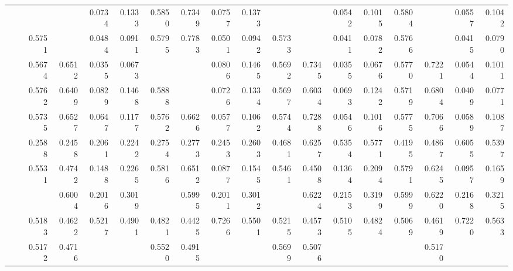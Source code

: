 {\begin{table*}[t]
{\begin{tabular}{|l|l|r|r|r|r|r|r|r|r|r|r|r|r|r|r|r|r|}
				\multirow{11}{*}{\rotatebox{90}{\Arxiv}} 
			     &\ATC       & \cellcolor{LightCyan}{0.5802} & \cellcolor{LightCyan}{0.7253} & 0.0734 & 0.1333 & 0.5850 & 0.7349 & 0.0757 & 0.1373 & \cellcolor{LightCyan}{0.5767} & \cellcolor{LightCyan}{0.7875} & 0.0542 & 0.1015 & 0.5804 & \cellcolor{LightCyan}{0.7930} & 0.0557 & 0.1042 \\
			      &\CTC       & 0.5751 & \cellcolor{LightRed}{0.7693} & 0.0484 & 0.0911 & 0.5795 & 0.7783 & 0.0501 & 0.0942 & 0.5733 & \cellcolor{LightRed}{0.8160} & 0.0411 & 0.0782 & 0.5766 & \cellcolor{LightRed}{0.8200} & 0.0415 & 0.0790 \\\cline{2-18}
			      &\MAML      & 0.5674 & 0.6512 & 0.0355 & 0.0673 & \cellcolor{LightRed}{0.5903} & \cellcolor{LightCyan}{0.8005} & 0.0806 & 0.1465 & 0.5692 & 0.7345 & 0.0355 & 0.0676 & 0.5770 & 0.7221 & 0.0544 & 0.1011 \\
			      &\Reptile   & 0.5762 & 0.6409 & 0.0829 & 0.1468 & 0.5888 & \cellcolor{LightRed}{0.8260} & 0.0726 & 0.1334 & 0.5697 & 0.6034 & 0.0693 & 0.1242 & 0.5719 & 0.6804 & 0.0409 & 0.0771 \\
			      &\Featrans  & 0.5735 & 0.6527 & 0.0647 & 0.1177 & 0.5762 & 0.6626 & 0.0577 & 0.1062 & 0.5744 & 0.7288 & 0.0546 & 0.1016 & 0.5775 & 0.7066 & 0.0589 & 0.1087 \\
			      &\PN        & 0.2588 & 0.2458 & 0.2061 & 0.2242 & 0.2754 & 0.2773 & 0.2453 & 0.2603 & 0.4681 & 0.6257 & 0.5354 & \cellcolor{LightCyan}0.5771 & 0.4195 & 0.4867 & 0.6055 & 0.5397 \\\cline{2-18}
			      &\Supervise & 0.5531 & 0.4742 & 0.1488 & 0.2265 & 0.5816 & 0.6512 & 0.0877 & 0.1545 & 0.5461 & 0.4508 & 0.1364 & 0.2094 & 0.5791 & 0.6245 & 0.0957 & 0.1659 \\
			      &\ICSGNN    & \cellcolor{LightRed}{0.5904} & 0.6004 & 0.2016 & 0.3019 & \cellcolor{LightCyan}{0.5896} & 0.5995 & 0.2011 & 0.3012 & \cellcolor{LightRed}{0.5968} & 0.6224 & 0.2153 & 0.3199 & 0.5999 & 0.6220 & 0.2168 & 0.3215 \\
			      &\AQDGNN    & 0.5183 & 0.4622 & 0.5217 & 0.4901 & 0.4821 & 0.4425 & 0.7266 & 0.5501 & 0.5215 & 0.4573 & 0.5105 & 0.4824 & 0.5069 & 0.4619 & 0.7220 & 0.5633 \\\cline{2-18}
			      &\CGNPIP    & 0.5172 & 0.4716 & \cellcolor{LightCyan}{0.8118} & \cellcolor{LightCyan}{0.5966} & 0.5520 & 0.4915 & \cellcolor{LightCyan}{0.7889} & \cellcolor{LightRed}{0.6057} & 0.5699 & 0.5076 & \cellcolor{LightRed}{0.8067} & \cellcolor{LightRed}{0.6231} & \cellcolor{LightRed}{0.5856} & 0.5170 & \cellcolor{LightCyan}{0.8083} & \cellcolor{LightRed}{0.6306} \\

\end{tabular}}
\end{table*}}
